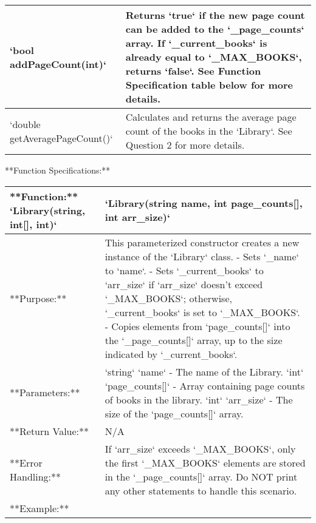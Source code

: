 {{{{{{{{{{{\begin{longtable}{|p{2.0in}|p{4.0in}|}
`bool addPageCount(int)` & Returns `true` if the new page count can be added to the `_page_counts` array. If `_current_books` is already equal to `_MAX_BOOKS`, returns `false`. See Function Specification table below for more details. \\ \hline

`double getAveragePageCount()` & Calculates and returns the average page count of the books in the `Library`. See Question 2 for more details. \\ \hline

\end{longtable}


**Function Specifications:**

\renewcommand{\arraystretch}{1.5}
\begin{longtable}{|p{1.7in}|p{4.3in}|}
\hline
**Function:** `Library(string, int[], int)` & `Library(string name, int page_counts[], int arr_size)` \\ \hline

**Purpose:** & This parameterized constructor creates a new instance of the `Library` class. \newline
- Sets `_name` to `name`. \newline
- Sets `_current_books` to `arr_size` if `arr_size` doesn't exceed `_MAX_BOOKS`; otherwise, `_current_books` is set to `_MAX_BOOKS`. \newline
- Copies elements from `page_counts[]` into the `_page_counts[]` array, up to the size indicated by `_current_books`. \\ \hline

**Parameters:** & 
`string` `name` - The name of the Library. \newline
`int` `page_counts[]` - Array containing page counts of books in the library. \newline
`int` `arr_size` - The size of the `page_counts[]` array. \\ \hline

**Return Value:** & N/A \\ \hline

**Error Handling:** & 
If `arr_size` exceeds `_MAX_BOOKS`, only the first `_MAX_BOOKS` elements are stored in the `_page_counts[]` array. Do NOT print any other statements to handle this scenario. \\ \hline

**Example:** & 


\begin{example}


{%

}
\end{example}
\end{longtable}}}}}}}}}}}}
